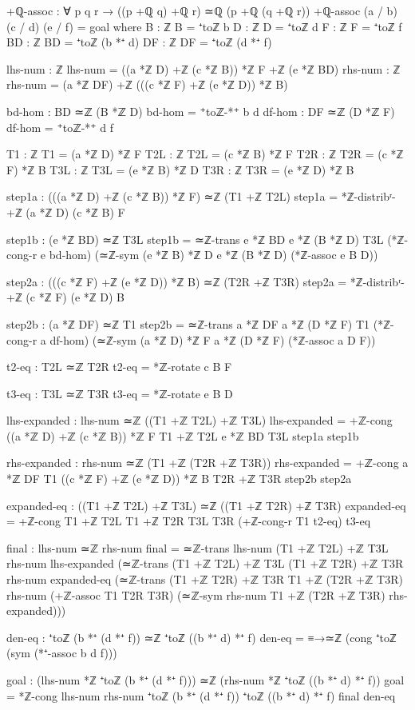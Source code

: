 \documentclass[11pt,a4paper]{book}
\begin{document}
\begin{code}
+ℚ-assoc : ∀ p q r → ((p +ℚ q) +ℚ r) ≃ℚ (p +ℚ (q +ℚ r))
+ℚ-assoc (a / b) (c / d) (e / f) = goal
  where
    B : ℤ
    B = ⁺toℤ b
    D : ℤ
    D = ⁺toℤ d
    F : ℤ
    F = ⁺toℤ f
    BD : ℤ
    BD = ⁺toℤ (b *⁺ d)
    DF : ℤ
    DF = ⁺toℤ (d *⁺ f)
    
    lhs-num : ℤ
    lhs-num = ((a *ℤ D) +ℤ (c *ℤ B)) *ℤ F +ℤ (e *ℤ BD)
    rhs-num : ℤ
    rhs-num = (a *ℤ DF) +ℤ (((c *ℤ F) +ℤ (e *ℤ D)) *ℤ B)

    bd-hom : BD ≃ℤ (B *ℤ D)
    bd-hom = ⁺toℤ-*⁺ b d
    df-hom : DF ≃ℤ (D *ℤ F)
    df-hom = ⁺toℤ-*⁺ d f

    T1 : ℤ
    T1 = (a *ℤ D) *ℤ F
    T2L : ℤ
    T2L = (c *ℤ B) *ℤ F
    T2R : ℤ
    T2R = (c *ℤ F) *ℤ B
    T3L : ℤ
    T3L = (e *ℤ B) *ℤ D
    T3R : ℤ
    T3R = (e *ℤ D) *ℤ B

    step1a : (((a *ℤ D) +ℤ (c *ℤ B)) *ℤ F) ≃ℤ (T1 +ℤ T2L)
    step1a = *ℤ-distribʳ-+ℤ (a *ℤ D) (c *ℤ B) F

    step1b : (e *ℤ BD) ≃ℤ T3L
    step1b = ≃ℤ-trans {e *ℤ BD} {e *ℤ (B *ℤ D)} {T3L}
              (*ℤ-cong-r e bd-hom)
              (≃ℤ-sym {(e *ℤ B) *ℤ D} {e *ℤ (B *ℤ D)} (*ℤ-assoc e B D))

    step2a : (((c *ℤ F) +ℤ (e *ℤ D)) *ℤ B) ≃ℤ (T2R +ℤ T3R)
    step2a = *ℤ-distribʳ-+ℤ (c *ℤ F) (e *ℤ D) B

    step2b : (a *ℤ DF) ≃ℤ T1
    step2b = ≃ℤ-trans {a *ℤ DF} {a *ℤ (D *ℤ F)} {T1}
              (*ℤ-cong-r a df-hom)
              (≃ℤ-sym {(a *ℤ D) *ℤ F} {a *ℤ (D *ℤ F)} (*ℤ-assoc a D F))

    t2-eq : T2L ≃ℤ T2R
    t2-eq = *ℤ-rotate c B F
    
    t3-eq : T3L ≃ℤ T3R
    t3-eq = *ℤ-rotate e B D

    lhs-expanded : lhs-num ≃ℤ ((T1 +ℤ T2L) +ℤ T3L)
    lhs-expanded = +ℤ-cong {((a *ℤ D) +ℤ (c *ℤ B)) *ℤ F} {T1 +ℤ T2L} {e *ℤ BD} {T3L} 
                    step1a step1b

    rhs-expanded : rhs-num ≃ℤ (T1 +ℤ (T2R +ℤ T3R))
    rhs-expanded = +ℤ-cong {a *ℤ DF} {T1} {((c *ℤ F) +ℤ (e *ℤ D)) *ℤ B} {T2R +ℤ T3R}
                    step2b step2a

    expanded-eq : ((T1 +ℤ T2L) +ℤ T3L) ≃ℤ ((T1 +ℤ T2R) +ℤ T3R)
    expanded-eq = +ℤ-cong {T1 +ℤ T2L} {T1 +ℤ T2R} {T3L} {T3R}
                   (+ℤ-cong-r T1 t2-eq) t3-eq

    final : lhs-num ≃ℤ rhs-num
    final = ≃ℤ-trans {lhs-num} {(T1 +ℤ T2L) +ℤ T3L} {rhs-num} lhs-expanded
            (≃ℤ-trans {(T1 +ℤ T2L) +ℤ T3L} {(T1 +ℤ T2R) +ℤ T3R} {rhs-num} expanded-eq
            (≃ℤ-trans {(T1 +ℤ T2R) +ℤ T3R} {T1 +ℤ (T2R +ℤ T3R)} {rhs-num} 
              (+ℤ-assoc T1 T2R T3R)
              (≃ℤ-sym {rhs-num} {T1 +ℤ (T2R +ℤ T3R)} rhs-expanded)))

    den-eq : ⁺toℤ (b *⁺ (d *⁺ f)) ≃ℤ ⁺toℤ ((b *⁺ d) *⁺ f)
    den-eq = ≡→≃ℤ (cong ⁺toℤ (sym (*⁺-assoc b d f)))

    goal : (lhs-num *ℤ ⁺toℤ (b *⁺ (d *⁺ f))) ≃ℤ (rhs-num *ℤ ⁺toℤ ((b *⁺ d) *⁺ f))
    goal = *ℤ-cong {lhs-num} {rhs-num} {⁺toℤ (b *⁺ (d *⁺ f))} {⁺toℤ ((b *⁺ d) *⁺ f)}
             final den-eq
\end{code}
\end{document}
